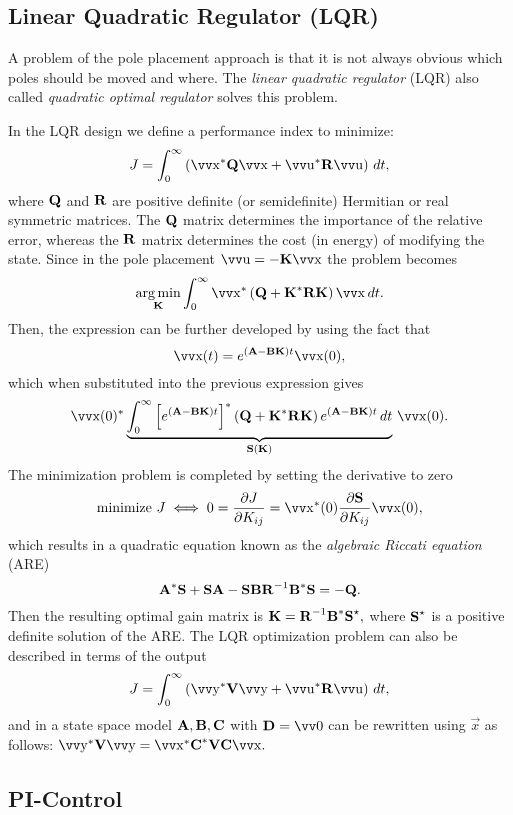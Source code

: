 \subsection{Linear Quadratic Regulator (LQR)}

A problem of the pole placement approach is that it is not always obvious which poles should be moved and where. The \emph{linear quadratic regulator} (LQR) also called \emph{quadratic optimal regulator} solves this problem.

In the LQR design we define a performance index to minimize:
\[
	J = \int_0^\infty \left(
		\vec{x}^* \mx{Q} \vec{x} + \vec{u}^* \mx{R} \vec{u}
	\right) \, dt,
\]
where \(\bm{\mathrm{Q}}\) and \(\bm{\mathrm{R}}\) are positive definite (or semidefinite) Hermitian or real symmetric matrices. The \(\bm{\mathrm{Q}}\) matrix determines the importance of the relative error, whereas the \(\bm{\mathrm{R}}\) matrix determines the cost (in energy) of modifying the state.  Since in the pole placement \(\vec{u} = -\mx{K}\vec{x}\) the problem becomes
\[
	\argmin_{\mx{K}}
	\int_0^\infty \vec{x}^* \left(
		\mx{Q} + \mx{K}^* \mx{R} \mx{K}
	\right) \vec{x} \, dt.
\]
Then, the expression can be further developed by using the fact that
\[
	\vec{x}(t) = e^{(\mx{A} - \mx{B}\mx{K}) t} \vec{x}(0),
\]
which when substituted into the previous expression gives
\[
	\vec{x}(0)^* \underbrace{\int_0^\infty \left[
			e^{(\mx{A} - \mx{B}\mx{K}) t}
		\right]^* \left(
			\mx{Q} + \mx{K}^* \mx{R} \mx{K}
		\right) e^{(\mx{A} - \mx{B}\mx{K}) t}
		\, dt}_{\mx{S}(\mx{K})}
	\, \vec{x}(0).
\]
The minimization problem is completed by setting the derivative to zero
\[
	\text{minimize } J \iff
	0 = \frac{\partial J}{\partial K_{ij}} =
	\vec{x}^*(0) \frac{\partial \mx{S}}{\partial K_{ij}} \vec{x}(0),
\]
which results in a quadratic equation known as the \emph{algebraic Riccati equation} (ARE)
\[
	\bm{\mathrm{A}}^* \bm{\mathrm{S}} + \bm{\mathrm{S}} \bm{\mathrm{A}} - \bm{\mathrm{S}} \bm{\mathrm{B}} \bm{\mathrm{R}}^{-1} \bm{\mathrm{B}}^* \bm{\mathrm{S}} = -\bm{\mathrm{Q}}.
\]
Then the resulting optimal gain matrix is
\(
	\bm{\mathrm{K}} = \bm{\mathrm{R}}^{-1} \bm{\mathrm{B}}^* \bm{\mathrm{S}}^\star,
\)
where $\bm{\mathrm{S}}^\star$ is a positive definite solution of the ARE.
The LQR optimization problem can also be described in terms of the output
\[
	J = \int_0^\infty \left(
		\vec{y}^* \mx{V} \vec{y} + \vec{u}^* \mx{R} \vec{u}
	\right) \, dt,
\]
and in a state space model \(\bm{\mathrm{A}}, \bm{\mathrm{B}}, \bm{\mathrm{C}}\) with \(\mx{D} = \vec{0}\) can be rewritten using \(\vec{x}\) as follows:
\(
	\vec{y}^* \mx{V} \vec{y} =
	\vec{x}^* \mx{C}^* \mx{V} \mx{C} \vec{x}.
\)

\subsection{PI-Control}

